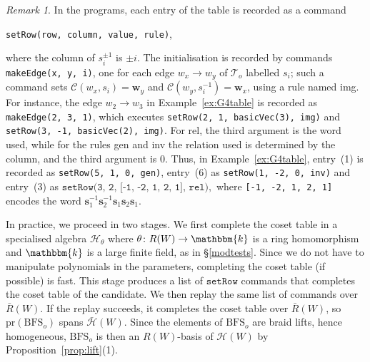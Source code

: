 \documentclass[11pt, reqno]{amsart}
\newcommand{\cC}{\mathcal{C}}
\newcommand{\cH}{\mathcal{H}}
\newcommand{\cT}{\mathcal{T}}
\newcommand{\bk}{\mathbbm{k}}
\numberwithin{equation}{section}
\theoremstyle{remark}
\newtheorem{remark}[theorem]{Remark}
\begin{document}
		\begin{remark}
			In the programs, each entry of the table is
			recorded as a command 
			\begin{center}
				\texttt{setRow(row, column, value, rule)},
			\end{center}
			where
			the column of $s_i^{\pm1}$ is $\pm i$. The initialisation is recorded
			by commands \texttt{makeEdge(x, y, i)}, one for each edge
			$w_x\to w_y$ of $\cT_o$ labelled $s_i$; such a command sets
			$\cC(w_x,s_i)=\mathbf w_y$ and $\cC(w_y,s_i^{-1})=\mathbf w_x$, using a
			rule named \textsf{img}. For instance, the edge $w_2\to w_3$ in
			Example~\ref{ex:G4table} is recorded as \texttt{makeEdge(2, 3, 1)}, which executes \texttt{setRow(2, 1, basicVec(3), img)}
			and \texttt{setRow(3, -1, basicVec(2), img)}. For \textsf{rel}, the third argument is the word used, while for the rules
			\textsf{gen} and \textsf{inv}  the
			relation used is determined by the column, and the third
			argument is $0$.
			Thus, in Example~\ref{ex:G4table}, entry~(1) is recorded as
			\texttt{setRow(5, 1, 0, gen)}, entry~(6) as \texttt{setRow(1, -2, 0, inv)} and entry~(3) as
			$
			\texttt{setRow(3, 2, [-1, -2, 1, 2, 1], rel)},
			$
			where \texttt{[-1, -2, 1, 2, 1]} encodes the word
			$\mathbf s_1^{-1}\mathbf s_2^{-1}\mathbf s_1\mathbf s_2\mathbf s_1$.	
		\end{remark}
		
		
		In practice, we proceed in two stages. We first complete the coset table in a
		specialised algebra $\cH_\theta$ where $\theta\colon R(W)\to\bk$ is a ring homomorphism and $\bk$ is a large finite field, as in \S\ref{modtests}. Since we do not have to manipulate polynomials in the parameters, completing the coset table (if possible) is fast. This stage produces a list of $\texttt{setRow}$
		commands that completes the coset table of the candidate. We then replay the same list of commands over $\bar R(W)$. If the
replay succeeds, it completes the coset table over $\bar R(W)$, so
$\mathrm{pr}(\mathrm{BFS}_o)$ spans $\bar{\mathcal H}(W)$. Since the
elements of $\mathrm{BFS}_o$ are braid lifts, hence homogeneous,
$\mathrm{BFS}_o$ is then an $R(W)$-basis of $\mathcal H(W)$ by
Proposition~\ref{prop:lift}(1).		
		
\end{document}

